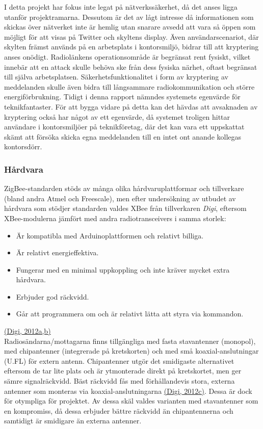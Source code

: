 \documentclass[a4paper,11pt]{article}
\begin{document}
I detta projekt har fokus inte legat på nätverkssäkerhet, då det anses ligga utanför projektramarna. Dessutom är det av lågt intresse då informationen som skickas över nätverket inte är hemlig utan snarare avsedd att vara så öppen som möjligt för att visas på Twitter och skyltens display. Även användarscenariot, där skylten främst används på en arbetsplats i kontorsmiljö, bidrar till att kryptering anses onödigt. Radiolänkens operationsområde är begränsat rent fysiskt, vilket innebär att en attack skulle behöva ske från dess fysiska närhet, oftast begränsat till själva arbetsplatsen. Säkerhetsfunktionalitet i form av kryptering av meddelanden skulle även bidra till långsammare radiokommunikation och större energiförbrukning. Tidigt i denna rapport nämndes systemets egenvärde för teknikfantaster. För att bygga vidare på detta kan det hävdas att avsaknaden av kryptering också har något av ett egenvärde, då systemet troligen hittar användare i kontorsmiljöer på teknikföretag, där det kan vara ett uppskattat skämt att försöka skicka egna meddelanden till en intet ont anande kollegas kontorsdörr.

\subsubsection{Hårdvara}
ZigBee-standarden stöds av många olika hårdvaruplattformar och tillverkare (bland andra Atmel och Freescale), men efter undersökning av utbudet av hårdvara som stödjer standarden valdes XBee från tillverkaren {\it Digi}, eftersom XBee-modulerna jämfört med andra radiotransceivers i samma storlek:
	
	\begin{itemize}
	\item Är kompatibla med Arduinoplattformen och relativt billiga.
    	\item Är relativt energieffektiva.
    	\item Fungerar med en minimal uppkoppling och inte kräver mycket extra hårdvara.
    	\item Erbjuder god räckvidd.
    	\item Går att programmera om och är relativt lätta att styra via kommandon.
	\end{itemize}
\hyperref[digi]{(Digi, 2012a,b)}\\
	
Radiosändarna/mottagarna finns tillgängliga med fasta stavantenner (monopol), med chipantenner (integrerade på kretskorten) och med små koaxial-anslutningar (U.FL) för extern antenn. Chipantenner utgör det smidigaste alternativet eftersom de tar lite plats och är ytmonterade direkt på kretskortet, men ger sämre signalräckvidd. Bäst räckvidd fås med förhållandevis stora, externa antenner som monteras via koaxial-anslutningarna \hyperref[digi]{(Digi, 2012c)}. Dessa är dock för otympliga för projektet. Av dessa skäl valdes varianten med stavantenner som en kompromiss, då dessa erbjuder bättre räckvidd än chipantennerna och samtidigt är smidigare än externa antenner. \\
\end{document}

